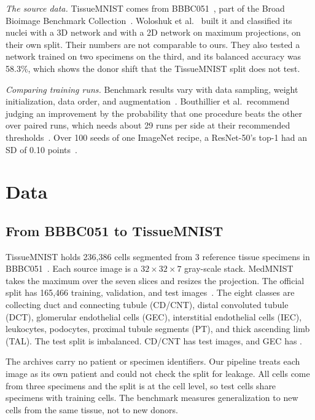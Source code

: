 \documentclass[conference]{IEEEtran}
\newif\ifanycitation
\let\citeAnyKey\cite
\renewcommand{\cite}{\global\anycitationtrue\citeAnyKey}
\begin{document}
\emph{The source data.} TissueMNIST comes from BBBC051~\cite{broad2021bbbc051}, part of
the Broad Bioimage Benchmark Collection~\cite{ljosa2012bbbc}. Woloshuk et
al.~\cite{woloshuk2021kidney} built it and classified its nuclei with a 3D network and
with a 2D network on maximum projections, on their own split. Their numbers are not
comparable to ours. They also tested a network trained on two specimens on the third,
and its balanced accuracy was 58.3\%, which shows the donor shift that the TissueMNIST
split does not test.

\emph{Comparing training runs.} Benchmark results vary with data sampling, weight
initialization, data order, and augmentation~\cite{bouthillier2021variance}. Bouthillier
et al.\ recommend judging an improvement by the probability that one procedure beats the
other over paired runs, which needs about 29 runs per side at their recommended
thresholds~\cite{bouthillier2021variance}. Over 100 seeds of one ImageNet recipe, a
ResNet-50's top-1 had an SD of 0.10 points~\cite{wightman2021resnet}.

\section{Data}
\label{sec:data}

\subsection{From BBBC051 to TissueMNIST}

TissueMNIST holds 236,386 cells segmented from 3 reference tissue specimens in
BBBC051~\cite{yang2023medmnistv2}. Each source image is a $32\times32\times7$ gray-scale
stack. MedMNIST takes the maximum over the seven slices and resizes the projection. The
official split has 165,466 training, \valN{} validation, and \testN{} test
images~\cite{yang2023medmnistv2}. The eight classes are collecting duct and connecting
tubule (CD/CNT), distal convoluted tubule (DCT), glomerular endothelial cells (GEC),
interstitial endothelial cells (IEC), leukocytes, podocytes, proximal tubule segments
(PT), and thick ascending limb (TAL). The test split is imbalanced. CD/CNT has
\countCDCNT{} test images, and GEC has \countGEC{}.

The archives carry no patient or specimen identifiers. Our pipeline treats each image as
its own patient and could not check the split for leakage. All cells come from three
specimens and the split is at the cell level, so test cells share specimens with
training cells. The benchmark measures generalization to new cells from the same tissue,
not to new donors.
\end{document}
